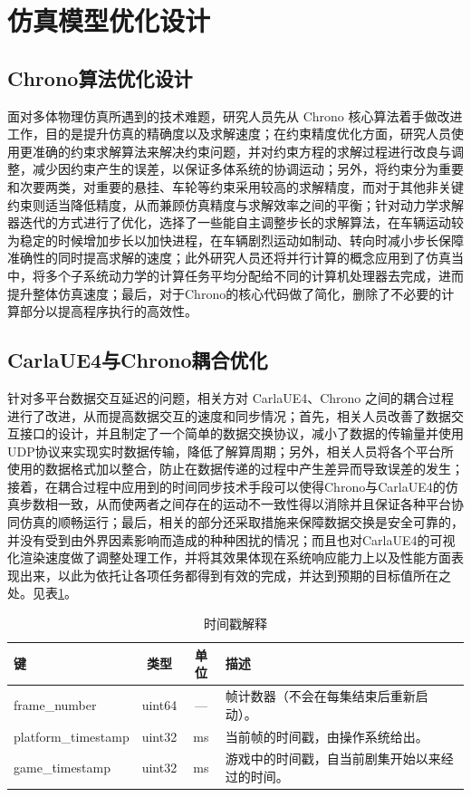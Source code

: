 \section{仿真模型优化设计}

\subsection{Chrono算法优化设计}

面对多体物理仿真所遇到的技术难题，研究人员先从 Chrono 核心算法着手做改进工作，目的是提升仿真的精确度以及求解速度；在约束精度优化方面，研究人员使用更准确的约束求解算法来解决约束问题，并对约束方程的求解过程进行改良与调整，减少因约束产生的误差，以保证多体系统的协调运动；另外，将约束分为重要和次要两类，对重要的悬挂、车轮等约束采用较高的求解精度，而对于其他非关键约束则适当降低精度，从而兼顾仿真精度与求解效率之间的平衡；针对动力学求解器迭代的方式进行了优化，选择了一些能自主调整步长的求解算法，在车辆运动较为稳定的时候增加步长以加快进程，在车辆剧烈运动如制动、转向时减小步长保障准确性的同时提高求解的速度；此外研究人员还将并行计算的概念应用到了仿真当中，将多个子系统动力学的计算任务平均分配给不同的计算机处理器去完成，进而提升整体仿真速度；最后，对于Chrono的核心代码做了简化，删除了不必要的计算部分以提高程序执行的高效性。

\subsection{CarlaUE4与Chrono耦合优化}
针对多平台数据交互延迟的问题，相关方对 CarlaUE4、Chrono 之间的耦合过程进行了改进，从而提高数据交互的速度和同步情况\cite{openhutb2025hutb}；首先，相关人员改善了数据交互接口的设计，并且制定了一个简单的数据交换协议，减小了数据的传输量并使用UDP协议来实现实时数据传输，降低了解算周期；另外，相关人员将各个平台所使用的数据格式加以整合，防止在数据传递的过程中产生差异而导致误差的发生；接着，在耦合过程中应用到的时间同步技术手段可以使得Chrono与CarlaUE4的仿真步数相一致，从而使两者之间存在的运动不一致性得以消除并且保证各种平台协同仿真的顺畅运行；最后，相关的部分还采取措施来保障数据交换是安全可靠的，并没有受到由外界因素影响而造成的种种困扰的情况；而且也对CarlaUE4的可视化渲染速度做了调整处理工作，并将其效果体现在系统响应能力上以及性能方面表现出来，以此为依托让各项任务都得到有效的完成，并达到预期的目标值所在之处。见表\ref{tab:timestamp}。

\begin{table}[H]
	\centering
	\caption{时间戳解释}
	\label{tab:timestamp}
	\begin{tabular}{lccp{8cm}}
		\toprule
		键                 & 类型     & 单位  & 描述 \\
		\midrule
		frame\_number       & uint64   & —     & 帧计数器（不会在每集结束后重新启动）。 \\
		platform\_timestamp & uint32   & ms    & 当前帧的时间戳，由操作系统给出。 \\
		game\_timestamp     & uint32   & ms    & 游戏中的时间戳，自当前剧集开始以来经过的时间。 \\
		\bottomrule
	\end{tabular}
\end{table}

